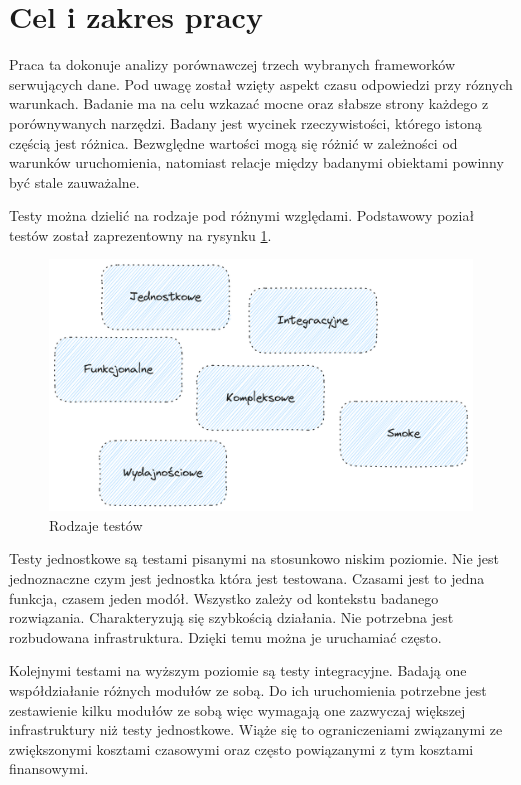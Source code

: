 \section{Cel i zakres pracy}

Praca ta dokonuje analizy porównawczej trzech wybranych frameworków serwujących dane.
Pod uwagę został wzięty aspekt czasu odpowiedzi przy róznych warunkach.
Badanie ma na celu wzkazać mocne oraz słabsze strony każdego z porównywanych narzędzi.
Badany jest wycinek rzeczywistości, którego istoną częścią jest różnica.
Bezwględne wartości mogą się różnić w zależności od warunków uruchomienia, natomiast relacje między badanymi obiektami powinny być stale zauważalne.


Testy można dzielić na rodzaje pod różnymi względami. Podstawowy poział testów został zaprezentowny na rysynku \ref{rys:test-types}\cite{atlassianRneRodzaje}.
\begin{figure}[!hb]
	\centering \includegraphics[width=1\linewidth]{rysunki/test-types.png}
	\caption{Rodzaje testów}
	\label{rys:test-types}
\end{figure}
Testy jednostkowe są testami pisanymi na stosunkowo niskim poziomie. Nie jest jednoznaczne czym jest jednostka która jest testowana.
Czasami jest to jedna funkcja, czasem jeden modół.
Wszystko zależy od kontekstu badanego rozwiązania.
Charakteryzują się szybkością działania.
Nie potrzebna jest rozbudowana infrastruktura.
Dzięki temu można je uruchamiać często.

Kolejnymi testami na wyższym poziomie są testy integracyjne.
Badają one współdziałanie różnych modułów ze sobą. 
Do ich uruchomienia potrzebne jest zestawienie kilku modułów ze sobą więc wymagają one zazwyczaj większej infrastruktury niż testy jednostkowe.
Wiąże się to ograniczeniami związanymi ze zwiększonymi kosztami czasowymi oraz często powiązanymi z tym kosztami finansowymi.

